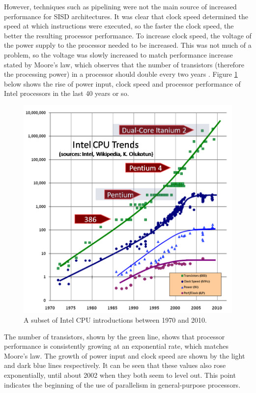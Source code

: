 \documentclass[a4paper, 12pt]{article}
\begin{document}
However, techniques such as pipelining were not the main source of increased performance for SISD architectures. It was clear that clock speed determined the speed at which instructions were executed, so the faster the clock speed, the better the resulting processor performance. To increase clock speed, the voltage of the power supply to the processor needed to be increased. This was not much of a problem, so the voltage was slowly increased to match performance increase stated by Moore's law, which observes that the number of transistors (therefore the processing power) in a processor should double every two years \cite{Moo65}. Figure \ref{fig:cpu_trends} below shows the rise of power input, clock speed and processor performance of Intel processors in the last 40 years or so.

\begin{figure}[H]
\centering
\includegraphics[width=\textwidth]{trend_graph.png}
\caption[A subset of Intel CPU introductions between 1970 and 2010]{A subset of Intel CPU introductions between 1970 and 2010. \cite{Sut05}}
\label{fig:cpu_trends}
\end{figure}

The number of transistors, shown by the green line, shows that processor performance is consistently growing at an exponential rate, which matches Moore's law. The growth of power input and clock speed are shown by the light and dark blue lines respectively. It can be seen that these values also rose exponentially, until about 2002 when they both seem to level out. This point indicates the beginning of the use of parallelism in general-purpose processors.
\end{document}
